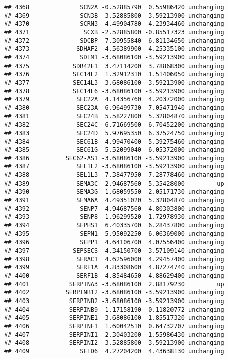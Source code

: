\documentclass[]{article}
\begin{document}
\begin{verbatim}
## 4368              SCN2A -0.52885790  0.55986420 unchanging
## 4369              SCN3B -3.52885800 -3.59213900 unchanging
## 4370              SCRN3  4.49904780  4.23934460 unchanging
## 4371               SCXB -2.52885800 -0.85517323 unchanging
## 4372              SDCBP  7.30955840  6.81134650 unchanging
## 4373             SDHAF2  4.56389900  4.25335100 unchanging
## 4374              SDIM1 -3.68086100 -3.59213900 unchanging
## 4375            SDR42E1  3.47114200  3.78868300 unchanging
## 4376            SEC14L2  1.32912310  1.51406050 unchanging
## 4377            SEC14L3 -3.68086100 -3.59213900 unchanging
## 4378            SEC14L6 -3.68086100 -3.59213900 unchanging
## 4379             SEC22A  4.14356760  4.20372000 unchanging
## 4380             SEC23A  6.96499730  7.05471940 unchanging
## 4381             SEC24B  5.58227800  5.32804870 unchanging
## 4382             SEC24C  6.71669500  6.70452200 unchanging
## 4383             SEC24D  5.97695350  6.37524750 unchanging
## 4384             SEC61B  4.99470400  5.39275460 unchanging
## 4385             SEC61G  5.52099040  6.05372000 unchanging
## 4386          SEC62-AS1 -3.68086100 -3.59213900 unchanging
## 4387             SEL1L2 -3.68086100 -3.59213900 unchanging
## 4388             SEL1L3  7.38477950  7.28778460 unchanging
## 4389             SEMA3C  2.94687560  5.35428000         up
## 4390             SEMA3G  1.68059550  2.05171730 unchanging
## 4391             SEMA6A  4.49351020  5.32804870 unchanging
## 4392              SENP7  4.94687560  4.80303800 unchanging
## 4393              SENP8  1.96299520  1.72978930 unchanging
## 4394             SEPHS1  6.40335700  6.28437800 unchanging
## 4395              SEPN1  5.95092250  6.06369000 unchanging
## 4396              SEPP1  4.64106700  4.07556400 unchanging
## 4397            SEPSECS  4.34150700  3.57109140 unchanging
## 4398             SERAC1  4.62596000  4.29457400 unchanging
## 4399             SERF1A  4.83308600  4.87274740 unchanging
## 4400             SERF1B  4.85484650  4.88629400 unchanging
## 4401           SERPINA3 -3.68086100  2.88179230         up
## 4402          SERPINB12 -3.68086100 -3.59213900 unchanging
## 4403           SERPINB2 -3.68086100 -3.59213900 unchanging
## 4404           SERPINB9  1.17158190 -0.11820772 unchanging
## 4405           SERPINE1 -3.68086100 -1.85517320 unchanging
## 4406           SERPINF1  1.60042510  0.64732707 unchanging
## 4407           SERPINI1  2.30403200  1.55986430 unchanging
## 4408           SERPINI2 -3.52885800 -3.59213900 unchanging
## 4409              SETD6  4.27204200  4.43638130 unchanging

\end{verbatim}
\end{document}
